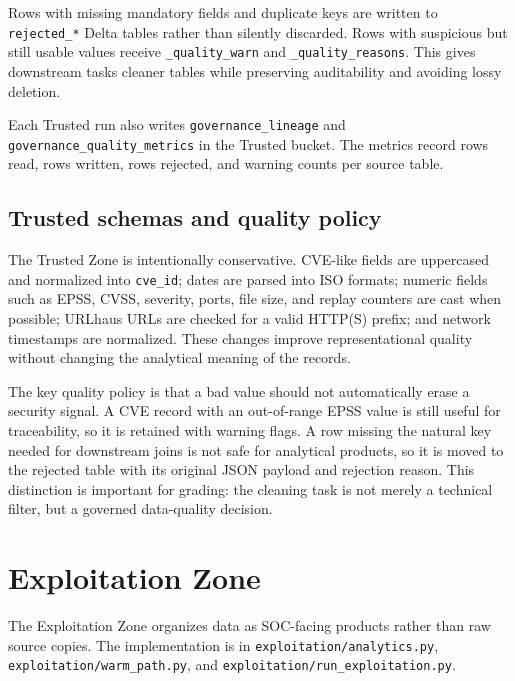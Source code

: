 \documentclass[11pt,a4paper]{article}
\newcommand{\code}[1]{\nolinkurl{#1}}
\begin{document}
Rows with missing mandatory fields and duplicate keys are written to \code{rejected_*} Delta tables rather than silently discarded. Rows with suspicious but still usable values receive \code{_quality_warn} and \code{_quality_reasons}. This gives downstream tasks cleaner tables while preserving auditability and avoiding lossy deletion.

Each Trusted run also writes \code{governance_lineage} and \code{governance_quality_metrics} in the Trusted bucket. The metrics record rows read, rows written, rows rejected, and warning counts per source table.

\subsection{Trusted schemas and quality policy}

The Trusted Zone is intentionally conservative. CVE-like fields are uppercased and normalized into \code{cve_id}; dates are parsed into ISO formats; numeric fields such as EPSS, CVSS, severity, ports, file size, and replay counters are cast when possible; URLhaus URLs are checked for a valid HTTP(S) prefix; and network timestamps are normalized. These changes improve representational quality without changing the analytical meaning of the records.

The key quality policy is that a bad value should not automatically erase a security signal. A CVE record with an out-of-range EPSS value is still useful for traceability, so it is retained with warning flags. A row missing the natural key needed for downstream joins is not safe for analytical products, so it is moved to the rejected table with its original JSON payload and rejection reason. This distinction is important for grading: the cleaning task is not merely a technical filter, but a governed data-quality decision.

\section{Exploitation Zone}

The Exploitation Zone organizes data as SOC-facing products rather than raw source copies. The implementation is in \code{exploitation/analytics.py}, \code{exploitation/warm_path.py}, and \code{exploitation/run_exploitation.py}.
\end{document}
